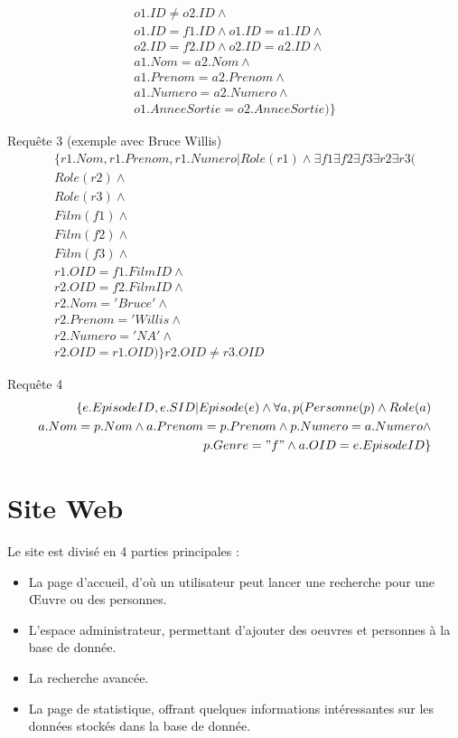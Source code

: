 \documentclass[10pt,a4paper]{article}
\begin{document}
\begin{list}{*}{}
\[\begin{aligned}
       o1.ID \neq o2.ID \wedge \\
       o1.ID = f1.ID \wedge o1.ID = a1.ID \wedge \\
       o2.ID = f2.ID \wedge o2.ID = a2.ID \wedge \\
       a1.Nom = a2.Nom \wedge \\
       a1.Prenom = a2.Prenom \wedge \\
       a1.Numero = a2.Numero \wedge \\
       o1.AnneeSortie = o2.AnneeSortie) \}
\end{aligned}\]
\item Requête 3 (exemple avec Bruce Willis)
\noindent
\[\begin{aligned}
\{r1.Nom, r1.Prenom, r1.Numero | Role(r1) \wedge \exists f1 \exists f2 \exists f3 \exists r2 \exists r3 (\\
	Role(r2) \wedge \\
    Role(r3) \wedge \\
    Film(f1) \wedge \\
    Film(f2) \wedge \\
    Film(f3) \wedge \\
    r1.OID = f1.FilmID \wedge \\
    r2.OID = f2.FilmID \wedge \\
    r2.Nom = 'Bruce' \wedge \\
    r2.Prenom = 'Willis \wedge \\
    r2.Numero = 'NA' \wedge \\
    r2.OID = r1.OID) \}
    r2.OID \neq r3.OID
\end{aligned}\]


\item Requête 4
\noindent
\[\begin{aligned}
\{e.EpisodeID, e.SID | Episode(e) \wedge \forall a, p (Personne(p) \wedge Role(a) \\
 	   a.Nom  = p.Nom \wedge a.Prenom = p.Prenom \wedge p.Numero = a.Numero \wedge \\
       p.Genre = "f" \wedge a.OID = e.EpisodeID \}
\end{aligned}\]
\end{list}

\newpage
\section{Site Web}

Le site est divisé en 4 parties principales : 
\vskip 3pt
\begin{itemize}
\item La page d’accueil, d'où un utilisateur peut lancer une recherche pour une Œuvre ou des personnes.
\item L'espace administrateur, permettant d'ajouter des oeuvres et personnes à la base de donnée.
\item La recherche avancée.
\item La page de statistique, offrant quelques informations intéressantes sur les données stockés dans la base de donnée.
\end{itemize}
\end{document}
